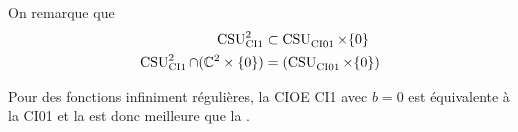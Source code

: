     On remarque que
    \begin{align}
      \CSU[2]{CI1} & \subset \CSU{CI01}\times\lbrace0\rbrace
      \\
      \CSU[2]{CI1}\cap(\CC^2 \times \lbrace0\rbrace) &= (\CSU{CI01}\times\lbrace0\rbrace)
    \end{align}

    Pour des fonctions infiniment régulières, la CIOE CI1 avec \(b=0\) est équivalente à la CI01 et la  est donc meilleure que la  .

